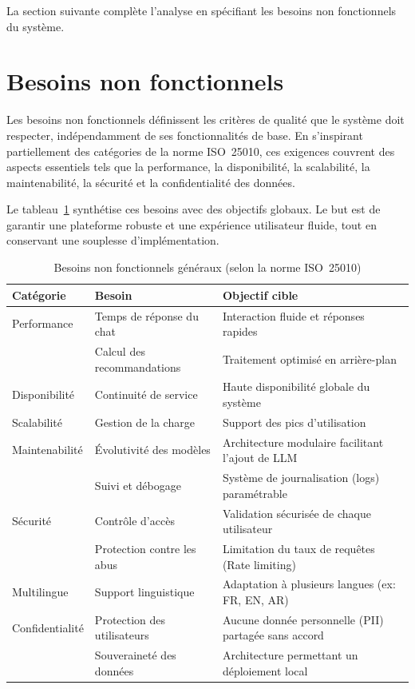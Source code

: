 La section suivante complète l'analyse en spécifiant les besoins non fonctionnels du système.


\section{Besoins non fonctionnels}
Les besoins non fonctionnels définissent les critères de qualité que le système doit respecter, 
indépendamment de ses fonctionnalités de base. En s'inspirant partiellement des catégories de la norme 
ISO~25010, ces exigences couvrent des aspects essentiels tels que la performance, la disponibilité, 
la scalabilité, la maintenabilité, la sécurité et la confidentialité des données.

Le tableau~\ref{tab:nfr} synthétise ces besoins avec des objectifs globaux. Le but est de garantir
une plateforme robuste et une expérience utilisateur fluide, tout en conservant une souplesse 
d'implémentation.

\begin{table}[H]
\centering
\caption{Besoins non fonctionnels généraux (selon la norme ISO~25010)}
\label{tab:nfr}
\small
\begin{tabular}{p{2.5cm} p{5.5cm} p{5.5cm}}
\toprule
\textbf{Catégorie} & \textbf{Besoin} & \textbf{Objectif cible} \\
\midrule
Performance & Temps de réponse du chat & Interaction fluide et réponses rapides \\
& Calcul des recommandations & Traitement optimisé en arrière-plan \\ [3pt]
Disponibilité & Continuité de service & Haute disponibilité globale du système \\
Scalabilité & Gestion de la charge & Support des pics d'utilisation \\ [3pt]
Maintenabilité & Évolutivité des modèles & Architecture modulaire facilitant l'ajout de LLM \\
& Suivi et débogage & Système de journalisation (logs) paramétrable \\ [3pt]
Sécurité & Contrôle d'accès & Validation sécurisée de chaque utilisateur \\
& Protection contre les abus & Limitation du taux de requêtes (Rate limiting) \\ [3pt]
Multilingue & Support linguistique & Adaptation à plusieurs langues (ex: FR, EN, AR) \\ [3pt]
Confidentialité & Protection des utilisateurs & Aucune donnée personnelle (PII) partagée sans accord \\
& Souveraineté des données & Architecture permettant un déploiement local \\
\bottomrule
\end{tabular}
\end{table}

